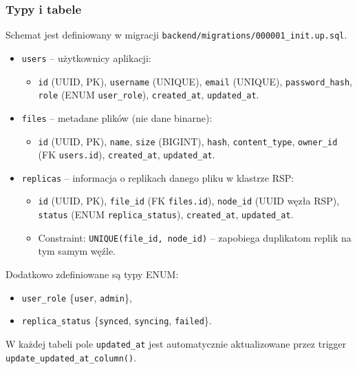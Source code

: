 \documentclass[12pt,a4paper]{article}
\begin{document}
	\subsubsection{Typy i tabele}
	Schemat jest definiowany w migracji \texttt{backend/migrations/000001\_init.up.sql}.
	\begin{itemize}
		\item \texttt{users} -- użytkownicy aplikacji:
		\begin{itemize}
			\item \texttt{id} (UUID, PK), \texttt{username} (UNIQUE), \texttt{email} (UNIQUE), \texttt{password\_hash}, \texttt{role} (ENUM \texttt{user\_role}), \texttt{created\_at}, \texttt{updated\_at}.
		\end{itemize}
		\item \texttt{files} -- metadane plików (nie dane binarne):
		\begin{itemize}
			\item \texttt{id} (UUID, PK), \texttt{name}, \texttt{size} (BIGINT), \texttt{hash}, \texttt{content\_type}, \texttt{owner\_id} (FK \textrightarrow{} \texttt{users.id}), \texttt{created\_at}, \texttt{updated\_at}.
		\end{itemize}
		\item \texttt{replicas} -- informacja o replikach danego pliku w klastrze RSP:
		\begin{itemize}
			\item \texttt{id} (UUID, PK), \texttt{file\_id} (FK \textrightarrow{} \texttt{files.id}), \texttt{node\_id} (UUID węzła RSP), \texttt{status} (ENUM \texttt{replica\_status}), \texttt{created\_at}, \texttt{updated\_at}.
			\item Constraint: \texttt{UNIQUE(file\_id, node\_id)} -- zapobiega duplikatom replik na tym samym węźle.
		\end{itemize}
	\end{itemize}

	Dodatkowo zdefiniowane są typy ENUM:
	\begin{itemize}
		\item \texttt{user\_role} \;\{\texttt{user}, \texttt{admin}\},
		\item \texttt{replica\_status} \;\{\texttt{synced}, \texttt{syncing}, \texttt{failed}\}.
	\end{itemize}

	W każdej tabeli pole \texttt{updated\_at} jest automatycznie aktualizowane przez trigger \texttt{update\_updated\_at\_column()}.
\end{document}
